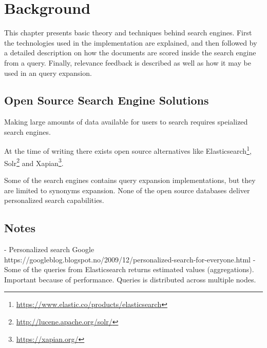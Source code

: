 \chapter{Background}
\label{ch:background}
This chapter presents basic theory and techniques behind search engines. First
the technologies used in the implementation are explained, and then followed by a
detailed description on how the documents are scored inside the search engine from a
query. Finally, relevance feedback is described as well as how it may be used in an query
expansion.

\section{Open Source Search Engine Solutions}
Making large amounts of data available for users to search requires speialized search engines.

At the time of writing there exists open source alternatives like Elasticsearch\footnote{\url{https://www.elastic.co/products/elasticsearch}},
Solr\footnote{\url{http://lucene.apache.org/solr/}} and Xapian\footnote{\url{https://xapian.org/}}.

Some of the search engines contains query expansion implementations,
but they are limited to synonyms expansion.
None of the open source databases deliver personalized search capabilities.






\section{Notes}
- Personalized search Google https://googleblog.blogspot.no/2009/12/personalized-search-for-everyone.html
- Some of the queries from Elasticsearch returns estimated values (aggregations). Important because of performance. Queries is distributed across multiple nodes.
